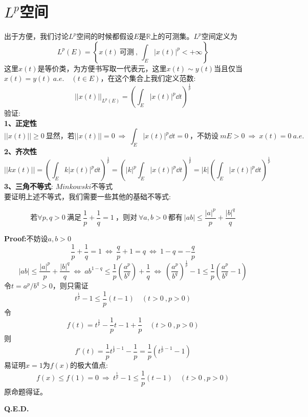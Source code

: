 \section{$L^p$空间} \label{lp}
出于方便，我们讨论$L^p$空间的时候都假设$E$是$\mathbb{R}$上的可测集。$L^p$空间定义为
\[L^p(E)=\left\{x(t) \ \text{可测} \ , \ \int_E|x(t)|^p<+\infty\right\}\]
这里$x(t)$是等价类，为方便书写取一代表元，这里$x(t) \sim y(t)$当且仅当$x(t)=y(t) \ a.e. \quad (t \in E)$，在这个集合上我们定义范数:
\[||x(t)||_{L^p(E)}=\left(\int_E|x(t)|^p\dd t\right)^{\frac{1}{p}}\]
验证:\\
\textbf{1、正定性}
\[||x(t)|| \geq 0 \ \text{显然，若}||x(t)||=0 \ \Rightarrow \ \int_E|x(t)|^p\dd t=0 \ \text{，不妨设} \ mE>0 \ \Rightarrow \ x(t)=0 \ a.e.\]
\textbf{2、齐次性}
\[||kx(t)||=\left(\int_Ek|x(t)|^p\dd t\right)^{\frac{1}{p}}=\left(|k|^p\int_E|x(t)|^p\dd t\right)^{\frac{1}{p}}=|k|\left(\int_E|x(t)|^p\dd t\right)^{\frac{1}{p}}\]
\textbf{3、三角不等式}: $Minkowski$不等式\\
要证明上述不等式，我们需要一些其他的基础不等式:
\begin{theorem}
    \[\text{若} \forall p,q>0 \ \text{满足} \ \frac{1}{p}+\frac{1}{q}=1 \ \text{，则对} \ \forall a,b>0 \ \text{都有} \ |ab| \leq \frac{|a|^p}{p}+\frac{|b|^q}{q}\]
\end{theorem}
\textbf{Proof:}不妨设$a,b>0$
\[\frac{1}{p}+\frac{1}{q}=1 \ \Leftrightarrow \ \frac{q}{p}+1=q \ \Leftrightarrow \ 1-q=-\frac{q}{p}\]
\[|ab| \leq \frac{|a|^p}{p}+\frac{|b|^q}{q} \ \Leftrightarrow \ ab^{1-q} \leq \frac{1}{p}\left(\frac{a^p}{b^q}\right)+\frac{1}{q} \ \Leftrightarrow \ \left(\frac{a^p}{b^q}\right)^{\frac{1}{p}}-1 \leq \frac{1}{p}\left(\frac{a^p}{b^q}-1\right)\]
令$t=a^p/b^q>0$，则只需证
\[t^{\frac{1}{p}}-1 \leq \frac{1}{p}(t-1) \quad (t>0 \ ,p>0)\]
令
\[f(t)=t^{\frac{1}{p}}-\frac{1}{p}t-1+\frac{1}{p} \quad (t>0 \ ,p>0)\]
则
\[f'(t)=\frac{1}{p}t^{\frac{1}{p}-1}-\frac{1}{p}=\frac{1}{p}\left(t^{\frac{1}{p}-1}-1\right)\]
易证明$x=1$为$f(x)$的极大值点:
\[f(x) \leq f(1)=0 \ \Rightarrow \ t^{\frac{1}{p}}-1 \leq \frac{1}{p}(t-1) \quad (t>0 \ ,p>0)\]
原命题得证。

\textbf{Q.E.D.}

